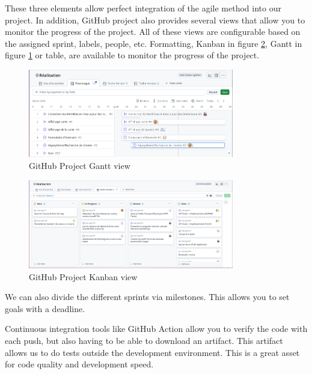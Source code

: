 These three elements allow perfect integration of the agile method into our project.
In addition, GitHub project also provides several views that allow you to monitor the progress of the project.
All of these views are configurable based on the assigned sprint, labels, people, etc.
Formatting, Kanban in figure \ref{fig:GitHubKanban}, Gantt in figure \ref{fig:GitHubGant} or table,
are available to monitor the progress of the project.


\begin{figure}[h]
    \centering
    \includegraphics[width=0.8\textwidth]{img/GitHubGant}
    \caption{GitHub Project Gantt view}
    \label{fig:GitHubGant}
\end{figure}

\begin{figure}[h]
    \centering
    \includegraphics[width=0.8\textwidth]{img/GitHubKanban}
    \caption{GitHub Project Kanban view}
    \label{fig:GitHubKanban}
\end{figure}

We can also divide the different sprints via milestones.
This allows you to set goals with a deadline.


\newpage

Continuous integration tools like GitHub Action allow you to verify the code with each push,
but also having to be able to download an artifact.
This artifact allows us to do tests outside the development environment.
This is a great asset for code quality and development speed.


